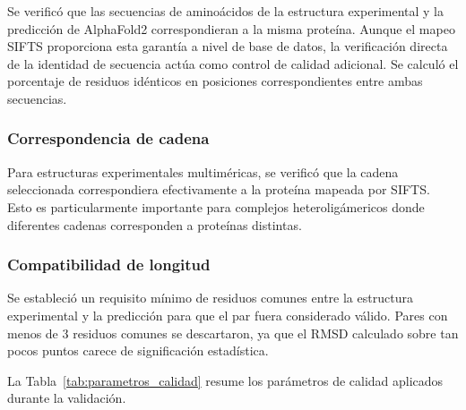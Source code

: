 Se verific\'o que las secuencias de amino\'acidos de la estructura experimental y la predicci\'on de AlphaFold2 correspondieran a la misma prote\'ina. Aunque el mapeo SIFTS proporciona esta garant\'ia a nivel de base de datos, la verificaci\'on directa de la identidad de secuencia act\'ua como control de calidad adicional. Se calcul\'o el porcentaje de residuos id\'enticos en posiciones correspondientes entre ambas secuencias.

\subsubsection{Correspondencia de cadena}

Para estructuras experimentales multim\'ericas, se verific\'o que la cadena seleccionada correspondiera efectivamente a la prote\'ina mapeada por SIFTS. Esto es particularmente importante para complejos heterolig\'americos donde diferentes cadenas corresponden a prote\'inas distintas.

\subsubsection{Compatibilidad de longitud}

Se estableci\'o un requisito m\'inimo de residuos comunes entre la estructura experimental y la predicci\'on para que el par fuera considerado v\'alido. Pares con menos de 3 residuos comunes se descartaron, ya que el RMSD calculado sobre tan pocos puntos carece de significaci\'on estad\'istica.

La Tabla~\ref{tab:parametros_calidad} resume los par\'ametros de calidad aplicados durante la validaci\'on.

